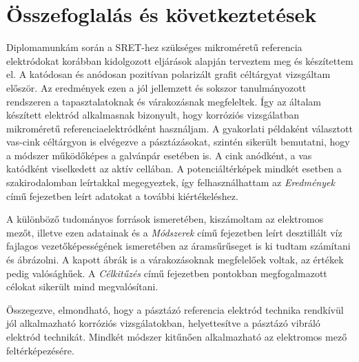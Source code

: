 \chapter{Összefoglalás és következtetések}
\pagestyle{headings}

Diplomamunkám során a SRET-hez szükséges mikroméretű referencia elektródokat korábban kidolgozott eljárások alapján terveztem meg és készítettem el. A katódosan és anódosan pozitívan polarizált grafit céltárgyat vizsgáltam először. Az eredmények ezen a jól jellemzett és sokszor tanulmányozott rendszeren a tapasztalatoknak és várakozásnak megfeleltek. Így az általam készített elektród alkalmasnak bizonyult, hogy korróziós vizsgálatban mikroméretű referenciaelektródként használjam. A gyakorlati példaként választott vas-cink céltárgyon is elvégezve a pásztázásokat, szintén sikerült bemutatni, hogy a módszer működőképes a galvánpár esetében is. A cink anódként, a vas katódként viselkedett az aktív cellában. A potenciáltérképek mindkét esetben a szakirodalomban leírtakkal megegyeztek, így felhasználhattam az \emph{Eredmények} című fejezetben leírt adatokat a további kiértékeléshez.

A különböző tudományos források ismeretében, kiszámoltam az elektromos mezőt, illetve ezen adatainak és a \emph{Módszerek} című fejezetben leírt desztillált víz fajlagos vezetőképességének ismeretében az áramsűrűseget is ki tudtam számítani és ábrázolni. A kapott ábrák is a várakozásoknak megfelelőek voltak, az értékek pedig valósághűek.
A \emph{Célkitűzés} című fejezetben pontokban megfogalmazott célokat sikerült mind megvalósítani.

Összegezve, elmondható, hogy a pásztázó referencia elektród technika rendkívül jól alkalmazható korróziós vizsgálatokban, helyettesítve a pásztázó vibráló elektród technikát. Mindkét módszer kitűnően alkalmazható az elektromos mező feltérképezésére.
